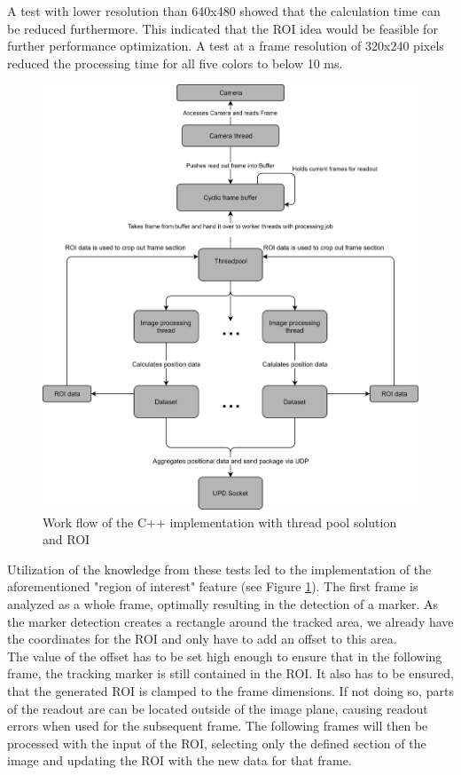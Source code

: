 A test with lower resolution than 640x480 showed that the calculation time can be  reduced furthermore. This indicated that the ROI idea would be feasible for  further performance optimization. A test at a frame resolution of 320x240 pixels reduced the processing time for all five colors to below 10 ms.\\
\begin{figure}[H]
\includegraphics[width=\textwidth]{images/pi_workflow_500.jpg}
\caption{Work flow of the C++ implementation with thread pool solution and ROI}
\label{c++ work flow map} 
\end{figure}
Utilization of the knowledge from these tests led to the implementation of the aforementioned "region of interest" feature (see Figure \ref{c++ work flow map}).
The first frame is analyzed as a whole frame, optimally resulting in the detection of a marker. As the marker detection creates a rectangle around the tracked area, we already have the coordinates for the ROI and only have to add an offset to this area.
\\The value of the offset has to be set high enough to ensure that in the following frame, the tracking marker is still contained in the ROI. It also has to be ensured, that the generated ROI is clamped to the frame dimensions. If not doing so, parts of the readout are can be located outside of the image plane, causing readout errors when used for the subsequent frame. The following frames will then be processed with the input of the ROI, selecting only the defined section of the image and updating the ROI with the new data for that frame.
